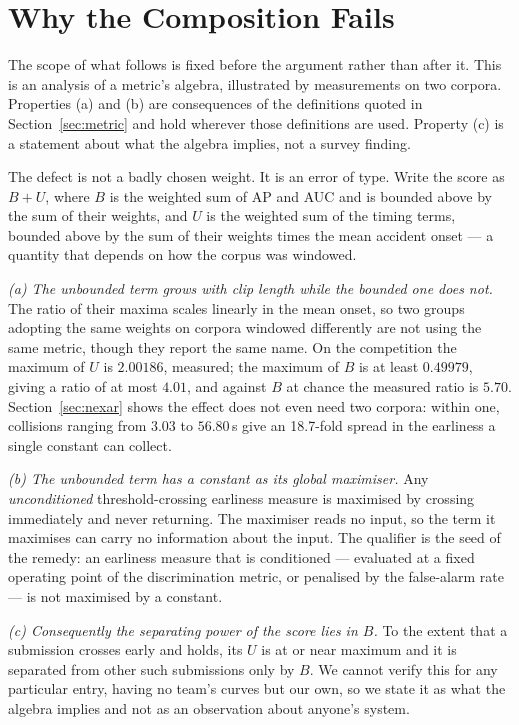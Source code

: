 \section{Why the Composition Fails}
\label{sec:why}

The scope of what follows is fixed before the argument rather than after it.
This is an analysis of a metric's algebra, illustrated by measurements on two
corpora. Properties (a) and (b) are consequences of the definitions quoted in
Section~\ref{sec:metric} and hold wherever those definitions are used. Property
(c) is a statement about what the algebra implies, not a survey finding.

The defect is not a badly chosen weight. It is an error of type. Write the
score as $B + U$, where $B$ is the weighted sum of AP and AUC and is bounded
above by the sum of their weights, and $U$ is the weighted sum of the timing
terms, bounded above by the sum of their weights times the mean accident onset
--- a quantity that depends on how the corpus was windowed.

\emph{(a) The unbounded term grows with clip length while the bounded one does
not.} The ratio of their maxima scales linearly in the mean onset, so two
groups adopting the same weights on corpora windowed differently are not using
the same metric, though they report the same name. On the competition the
maximum of $U$ is $2.00186$, measured; the maximum of $B$ is at least $0.49979$,
giving a ratio of at most $4.01$, and against $B$ at chance the measured ratio
is $5.70$. Section~\ref{sec:nexar} shows the effect does not even need two
corpora: within one, collisions ranging from $3.03$ to $56.80$\,s give an
18.7-fold spread in the earliness a single constant can collect.

\emph{(b) The unbounded term has a constant as its global maximiser.} Any
\emph{unconditioned} threshold-crossing earliness measure is maximised by
crossing immediately and never returning. The maximiser reads no input, so the
term it maximises can carry no information about the input. The qualifier is
the seed of the remedy: an earliness measure that is conditioned --- evaluated
at a fixed operating point of the discrimination metric, or penalised by the
false-alarm rate --- is not maximised by a constant.

\emph{(c) Consequently the separating power of the score lies in $B$.} To the
extent that a submission crosses early and holds, its $U$ is at or near maximum
and it is separated from other such submissions only by $B$. We cannot verify
this for any particular entry, having no team's curves but our own, so we state
it as what the algebra implies and not as an observation about anyone's system.

